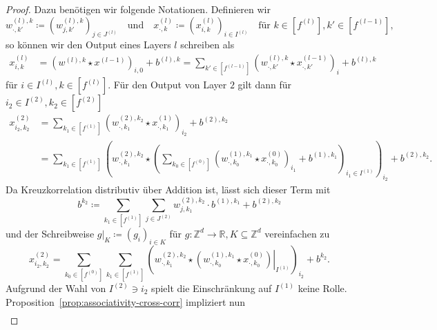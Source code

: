 \documentclass[paper=a4, 	%
		fontsize=11pt,
		abstract=true, 	%
		headsepline, 	%
		notitlepage	%
		]{scrartcl}
\theoremstyle{definition}
\newcommand{\R}{\mathbb{R}}
\newcommand{\Z}{\mathbb{Z}}
\newcommand{\bcdot}{\boldsymbol{\cdot}}
\newcommand{\fNat}[1]{[ #1 ]}
\begin{document}
\begin{proof}
    Dazu benötigen wir folgende Notationen.
    Definieren wir \[
        w^{(l), k}_{\bcdot, k'}\coloneqq \left( w_{j,k'}^{(l),k}\right)_{j\in J^{(l)}}
        \quad \text{und} \quad
        x^{(l)}_{\bcdot, k} \coloneqq \left( x^{(l)}_{i,k} \right)_{i\in I^{(l)}}
        \quad \text{für $k\in \fNat{f^{(l)}}, k'\in\fNat{f^{(l-1)}}$},
    \]
    so können wir den Output eines Layers $l$ schreiben als 
    \begin{align*}
        x^{(l)}_{i, k}
        &=  \left( w^{(l),k} \star x^{(l-1)}\right)_{i,0} + b^{(l),k}
        = \sum_{k'\in \fNat{f^{(l-1)}}}  \left(w^{(l),k}_{\bcdot,k'} \star x^{(l-1)}_{\bcdot,k'} \right)_i + b^{(l),k}
    \end{align*}
    für $i\in I^{(l)}, k\in\fNat{f^{(l)}}$.
    Für den Output von Layer $2$ gilt dann für $i_2\in I^{(2)}, k_2\in \fNat{f^{(2)}}$
    \begin{align*}
        x^{(2)}_{i_2,k_2}
        &= \sum_{k_1\in \fNat{f^{(1)}}}  \left(w^{(2),k_2}_{\bcdot,k_1} \star x^{(1)}_{\bcdot,k_1} \right)_{i_2} + b^{(2),k_2} \\
        &= \sum_{k_1\in \fNat{f^{(1)}}}  \left(w^{(2),k_2}_{\bcdot,k_1} \star \left( 
%
            \sum_{k_0\in \fNat{f^{(0)}}}  \left(w^{(1),k_1}_{\bcdot,k_0} \star x^{(0)}_{\bcdot,k_0} \right)_{i_1} + b^{(1),k_1}
%
         \right)_{i_1\in I^{(1)}} \right)_{i_2} + b^{(2),k_2}.
    \end{align*}
    Da Kreuzkorrelation distributiv über Addition ist, lässt sich dieser Term mit \[
        b^{k_2}\coloneqq \sum_{k_1\in\fNat{f^{(1)}}}\sum_{j\in J^{(2)}} w^{(2), k_2}_{j,k_1} \cdot b^{(1),k_1} + b^{(2), k_2}
    \]
    \newcommand{\rest}[2]{\left.{#1}\right|_{#2}}
    und der Schreibweise $\rest{g}{K} \coloneqq (g_i)_{i\in K}$ für $g: \Z^d \rightarrow \R, K\subseteq \Z^d$ vereinfachen zu 
    \[
        x^{(2)}_{i_2,k_2} 
        = \sum_{k_0\in \fNat{f^{(0)}}}\sum_{k_1\in \fNat{f^{(1)}}}  \left(w^{(2),k_2}_{\bcdot,k_1} \star 
        \rest{\left(w^{(1),k_1}_{\bcdot,k_0} \star x^{(0)}_{\bcdot,k_0} \right)}{I^{(1)}}
        \right)_{i_2} + b^{k_2}.
    \]
    Aufgrund der Wahl von $I^{(2)}\ni i_2$ spielt die Einschränkung auf $I^{(1)}$ keine Rolle.
    Proposition~\ref{prop:associativity-cross-corr} impliziert nun
    \begin{align*}

\end{align*}
\end{proof}
\end{document}
